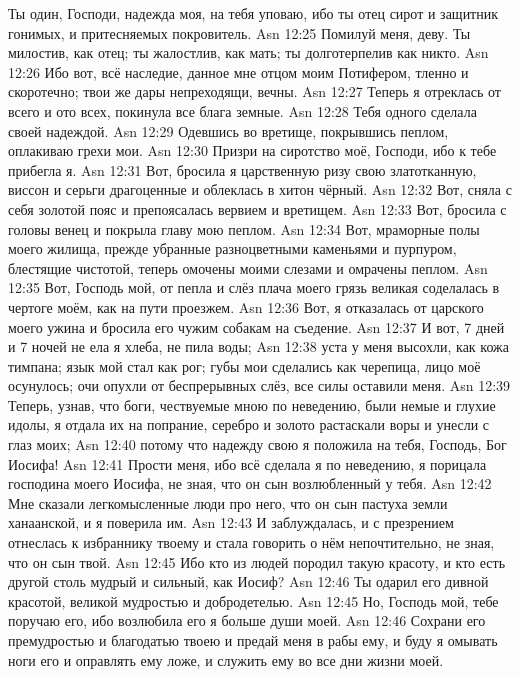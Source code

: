 Ты один, Господи, надежда моя, на тебя уповаю,
ибо ты отец сирот и защитник гонимых, и притесняемых
покровитель.
\vs Asn 12:25
Помилуй меня, деву.
Ты милостив, как отец;
ты жалостлив, как мать;
ты долготерпелив как никто.
\vs Asn 12:26
Ибо вот, всё наследие,
данное мне отцом моим Потифером,
тленно и скоротечно;
твои же дары непреходящи, вечны.
\vs Asn 12:27
Теперь я отреклась от всего
и ото всех, покинула все блага земные.
\vs Asn 12:28
Тебя одного сделала своей надеждой.
\vs Asn 12:29
Одевшись во вретище,
покрывшись пеплом, оплакиваю грехи мои.
\vs Asn 12:30
Призри на сиротство моё,
Господи, ибо к тебе прибегла я.
\vs Asn 12:31
Вот, бросила я царственную
ризу свою златотканную,
виссон и серьги драгоценные и облеклась в хитон чёрный.
\vs Asn 12:32
Вот, сняла с себя золотой пояс
и препоясалась вервием и вретищем.
\vs Asn 12:33
Вот, бросила с головы венец
и покрыла главу мою пеплом.
\vs Asn 12:34
Вот, мраморные полы моего жилища,
прежде убранные разноцветными каменьями и пурпуром,
блестящие чистотой,
теперь омочены моими слезами и омрачены пеплом.
\vs Asn 12:35
Вот, Господь мой, от пепла и слёз плача моего
грязь великая соделалась в чертоге моём,
как на пути проезжем.
\vs Asn 12:36
Вот, я отказалась от царского моего ужина
и бросила его чужим собакам на съедение.
\vs Asn 12:37
И вот, 7 дней и 7 ночей не ела я хлеба, не пила воды;
\vs Asn 12:38
уста у меня высохли,
как кожа тимпана;
язык мой стал как рог;
губы мои сделались как черепица,
лицо моё осунулось;
очи опухли от беспрерывных слёз,
все силы оставили меня.
\vs Asn 12:39
Теперь, узнав, что боги,
чествуемые мною по неведению,
были немые и глухие идолы,
я отдала их на попрание,
серебро и золото растаскали воры и унесли с глаз моих;
\vs Asn 12:40
потому что надежду свою я положила на тебя, Господь, Бог Иосифа!
\vs Asn 12:41
Прости меня, ибо всё сделала я по неведению,
я порицала господина моего Иосифа, не зная,
что он сын возлюбленный у тебя.
\vs Asn 12:42
Мне сказали легкомысленные люди про него,
что он сын пастуха земли ханаанской, и я поверила им.
\vs Asn 12:43
И заблуждалась, и с презрением отнеслась
к избраннику твоему и стала говорить о нём непочтительно,
не зная, что он сын твой.
\vs Asn 12:45
Ибо кто из людей породил такую красоту,
и кто есть другой столь мудрый и сильный, как Иосиф?
\vs Asn 12:46
Ты одарил его дивной красотой, великой мудростью и добродетелью.
\vs Asn 12:45
Но, Господь мой, тебе
поручаю его, ибо возлюбила его я больше души моей.
\vs Asn 12:46
Сохрани его премудростью и благодатью твоею
и предай меня в рабы ему, и буду я омывать ноги его и оправлять
ему ложе, и служить ему во все дни жизни моей.

